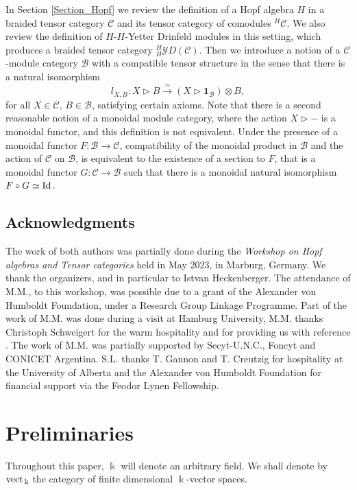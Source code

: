 \documentclass[11pt]{amsart}
\newcommand{\ca}{{\mathcal C}}
\newcommand{\ot}{{\otimes}}
\newcommand{\vc}{{\mathcal C}}
\newcommand{\Bc}{{\mathcal B}}
\newcommand{\YD}{{\mathcal YD}}
\newcommand{\ku}{{\Bbbk}}
\newcommand{\uno}{ \mathbf{1}}
\newcommand{\Id}{\mbox{\rm Id\,}}
\newcommand{\vect}{\mbox{\rm vect\,}}
\renewcommand{\_}[1]{\mbox{$_{\left( #1 \right)}$}}
\theoremstyle{plain}
\numberwithin{equation}{section}
\theoremstyle{definition}
\theoremstyle{remark}
\theoremstyle{introTheorems}
\begin{document}
In Section \ref{Section_Hopf} we review the definition of a Hopf algebra $H$ in a braided tensor category $\vc$ and its tensor category of comodules ${^H}\vc$. We also review the definition of $H$-$H$-Yetter Drinfeld modules in this setting, which produces a braided tensor category ${^H_H}\YD(\vc)$. Then we introduce a notion of a $\vc$-module category $\Bc$ with a compatible tensor structure in the sense that there is a natural isomorphism 
$$l_{X,B}: X \triangleright B\xrightarrow{\;\simeq\; } (X\triangleright \uno_\Bc)\ot B,$$
for all $X\in\vc,\,B\in\Bc$, satisfying certain axioms. Note that there is a second reasonable notion of a monoidal module category, where the action $X\triangleright-$ is a monoidal functor, and this definition is not equivalent. Under the presence of a monoidal  functor $F:\Bc\to \ca$, compatibility of the monoidal product in $\Bc$ and the action of $\vc$ on $\Bc$, is equivalent to the existence of a section to $F$, that is a monoidal functor $G:\vc\to \Bc$ such that there is a monoidal natural isomorphism $F\circ G\simeq \Id.$




\subsection*{Acknowledgments} The work of both authors was partially done during the \emph{Workshop on Hopf algebras and Tensor categories} held in May 2023, in Marburg, Germany. We thank the organizers, and in particular to Istvan Heckenberger. The attendance of M.M., to this workshop, was possible due to a  grant of the Alexander von Humboldt Foundation, under a Research Group Linkage Programme. Part of the work of M.M. was done during a visit at Hamburg University, M.M.  thanks Christoph Schweigert for the warm hospitality and for providing us with reference \cite{H}. The work of M.M. was partially supported by Secyt-U.N.C., Foncyt and CONICET Argentina. S.L. thanks T. Gannon and T. Creutzig for hospitality at the University of Alberta and the Alexander von Humboldt Foundation for financial support via the Feodor Lynen Fellowship. 



\section{Preliminaries}

Throughout this paper, $\ku$ will denote an arbitrary field. 
 We shall denote by $\vect_\ku$ the category of finite dimensional $\ku$-vector spaces. 
 
\end{document}

